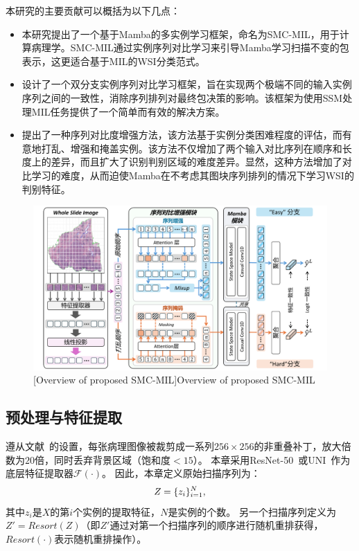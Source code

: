 本研究的主要贡献可以概括为以下几点：
\begin{itemize}
  \item 本研究提出了一个基于Mamba的多实例学习框架，命名为SMC-MIL，用于计算病理学。SMC-MIL通过实例序列对比学习来引导Mamba学习扫描不变的包表示，这更适合基于MIL的WSI分类范式。
  \item 设计了一个双分支实例序列对比学习框架，旨在实现两个极端不同的输入实例序列之间的一致性，消除序列排列对最终包决策的影响。该框架为使用SSM处理MIL任务提供了一个简单而有效的解决方案。
  \item 提出了一种序列对比度增强方法，该方法基于实例分类困难程度的评估，而有意地打乱、增强和掩盖实例。该方法不仅增加了两个输入对比序列在顺序和长度上的差异，而且扩大了识别判别区域的难度差异。显然，这种方法增加了对比学习的难度，从而迫使Mamba在不考虑其图块序列排列的情况下学习WSI的判别特征。 
\end{itemize}

\begin{figure}[h]
  \centering
  \includegraphics[width=1.0\columnwidth]{figures/SMCMIL.pdf}
  [Overview of proposed SMC-MIL]{Overview of proposed SMC-MIL}
  \label{figure3: SMCMIL}
\end{figure}

\subsection[\hspace{-2pt}预处理与特征提取]{{\heiti{} \hspace{-8pt}预处理与特征提取}}\label{section4: 预处理与特征提取}

遵从文献~\cite{lu2021data}的设置，每张病理图像被裁剪成一系列$256\times256$的非重叠补丁，放大倍数为$20$倍，同时丢弃背景区域（饱和度$< 15$）。
本章采用ResNet-50~\cite{ROYERCARFAGNI2001253}或UNI~\cite{chen2024towards}作为底层特征提取器$\mathcal{F}(\cdot)$。
因此，本章定义原始扫描序列为：
\begin{equation}
  \mathnormal{Z}=\{z_i\}^{\mathnormal{N}}_{i=1},
\end{equation}
其中$z_i$是$X$的第$i$个实例的提取特征，$N$是实例的个数。
另一个扫描序列定义为$Z'=Resort(Z)$（即$Z'$通过对第一个扫描序列的顺序进行随机重排获得，$Resort(\cdot)$表示随机重排操作）。

